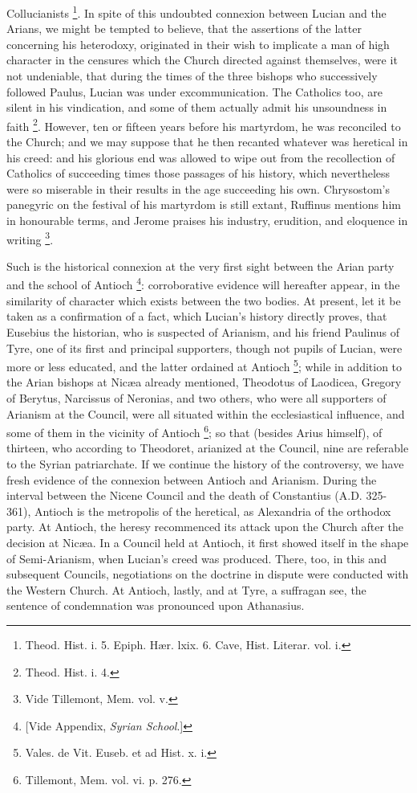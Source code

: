 Collucianists \footnote{Theod. Hist. i. 5. Epiph. Hær. lxix. 6.
Cave, Hist. Literar. vol. i.}. In
spite of this undoubted connexion between Lucian and the Arians, we
might be tempted to believe, that the assertions of the latter
concerning his heterodoxy, originated in their wish to implicate a man
of high character in the censures which the Church directed against
themselves, were it not undeniable, that during the times of the three
bishops who successively followed Paulus, Lucian was under
excommunication. The Catholics too, are silent in his vindication, and
some of them actually admit his unsoundness in faith \footnote{Theod. Hist. i. 4.}. However, ten or fifteen years before his martyrdom, he was
reconciled to the Church; and we may suppose that he then recanted
whatever was heretical in his creed: and his glorious end was allowed
to wipe out from the recollection of Catholics of succeeding times
those passages of his history, which nevertheless were so miserable in
their results in the age succeeding his own. Chrysostom's panegyric on
the festival of his martyrdom is still extant, Ruffinus mentions him
in honourable terms, and Jerome praises his industry, erudition, and
eloquence in writing \footnote{Vide Tillemont, Mem. vol. v.}.

Such is the historical connexion at the very first sight between
the Arian party and the school of Antioch \footnote{[Vide Appendix, \emph{Syrian School}.]}: corroborative evidence will hereafter appear, in the
similarity of character which exists between the two bodies. At
present, let it be taken as a confirmation of a fact, which Lucian's
history directly proves, that Eusebius the historian, who is suspected
of Arianism, and his friend Paulinus of Tyre, one of its first and
principal supporters, though not pupils of Lucian, were more or less
educated, and the latter ordained at Antioch \footnote{Vales. de Vit. Euseb. et ad Hist. x. i.}; while in addition to the Arian bishops at Nicæa already
mentioned, Theodotus of Laodicea, Gregory of Berytus, Narcissus of
Neronias, and two others, who were all supporters of Arianism at the
Council, were all situated within the ecclesiastical influence, and
some of them in the vicinity of Antioch \footnote{Tillemont, Mem. vol. vi. p. 276.}; so that (besides Arius himself), of thirteen, who according
to Theodoret, arianized at the Council, nine are referable to the
Syrian patriarchate. If we continue the history of the controversy, we
have fresh evidence of the connexion between Antioch and Arianism.
During the interval between the Nicene Council and the death of
Constantius (A.D. 325-361), Antioch is the
metropolis of the heretical, as Alexandria of the orthodox party. At
Antioch, the heresy recommenced its attack upon the Church after the
decision at Nicæa. In a Council held at Antioch, it first showed
itself in the shape of Semi-Arianism, when Lucian's creed was
produced. There, too, in this and subsequent Councils, negotiations on
the doctrine in dispute were conducted with the Western Church. At
Antioch, lastly, and at Tyre, a suffragan see, the sentence of
condemnation was pronounced upon Athanasius.

